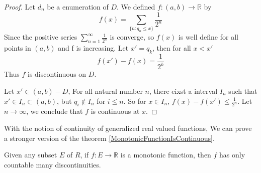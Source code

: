 \documentclass[lang=en, 12pt]{elegantbook}
\newcommand{\RR}{\mathbb{R}}
\begin{document}
        \begin{proof}
            Let ${d_n}$ be a enumeration of $D$. We defined $f:(a,b)\to \RR$ by 
            $$f(x) = \sum_{\{n: q_n \leq x\}} \frac{1}{2^n}$$ 
        Since the positive series $\sum_{n=1}^{\infty}\frac{1}{2^n}$ is converge, so $f(x)$ is well define for all points in $(a,b)$ and 
        f is increasing. Let $x'=q_k$, then for all $x <x'$ 
        $$f(x') - f(x) = \frac{1}{2^k}$$
        Thus $f$ is discontinuous on $D$.\par
            Let $x' \in (a,b) - D$, For all natural number $n$, there eixst a interval $I_n$ such that $x' \in I_n \subset (a,b)$, but
        $q_i \notin I_n$ for $i \leq n$. So for $x \in I_n$, $f(x) - f(x') \leq \frac{1}{2^n}$. Let $n \to \infty$, we conclude that $f$ 
        is continuous at $x$.
        \end{proof}
        With the notion of continuity of generalized real valued functions, We can prove a stronger version of the theorem \ref{MonotonicFunctionIsContinuous}.
        \begin{theorem}
            Given any subset $E$ of $R$, if $f:E \to \RR$ is a monotonic function, then $f$ has only countable many discontinuities.
        \end{theorem}
\end{document}
